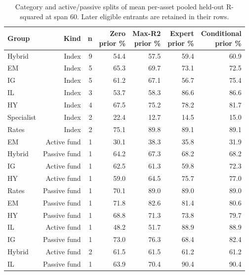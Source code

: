 \documentclass[a4paper,review]{cas-sc}
\begin{document}
\begin{table}[pos=htbp]
\centering
\small
\caption{Category and active/passive splits of mean per-asset pooled held-out R-squared at span 60. Later eligible entrants are retained in their rows.}
\begin{adjustbox}{max width=\linewidth}
\begin{tabular}{lrrrrrr}
\toprule
Group & Kind & n & \shortstack{Zero\\prior} \% & \shortstack{Max-R2\\prior} \% & \shortstack{Expert\\prior} \% & \shortstack{Conditional\\prior} \% \\
\midrule
Hybrid & Index & 9 & 54.4 & 57.5 & 59.4 & 60.9 \\
EM & Index & 5 & 65.3 & 69.7 & 73.1 & 72.5 \\
IG & Index & 5 & 61.2 & 67.1 & 56.7 & 75.4 \\
IL & Index & 3 & 53.7 & 58.3 & 86.6 & 86.6 \\
HY & Index & 4 & 67.5 & 75.2 & 78.2 & 81.7 \\
Specialist & Index & 2 & 22.4 & 12.7 & 14.5 & 15.0 \\
Rates & Index & 2 & 75.1 & 89.8 & 89.1 & 89.1 \\
EM & Active fund & 1 & 30.1 & 38.3 & 35.8 & 31.9 \\
Hybrid & Passive fund & 1 & 64.2 & 67.3 & 68.2 & 68.2 \\
IG & Active fund & 1 & 62.5 & 61.3 & 59.8 & 72.3 \\
HY & Active fund & 1 & 59.0 & 64.5 & 75.7 & 77.0 \\
Rates & Passive fund & 1 & 70.1 & 89.0 & 89.0 & 89.0 \\
EM & Passive fund & 1 & 71.8 & 82.6 & 81.4 & 80.6 \\
HY & Passive fund & 1 & 68.8 & 71.3 & 73.8 & 79.7 \\
IL & Active fund & 1 & 48.2 & 51.7 & 88.9 & 88.9 \\
IG & Passive fund & 1 & 73.0 & 76.3 & 68.4 & 82.4 \\
Hybrid & Active fund & 2 & 61.5 & 61.5 & 61.2 & 61.2 \\
IL & Passive fund & 1 & 63.9 & 70.4 & 90.4 & 90.4 \\
\bottomrule
\end{tabular}
\end{adjustbox}
\end{table}
\end{document}
